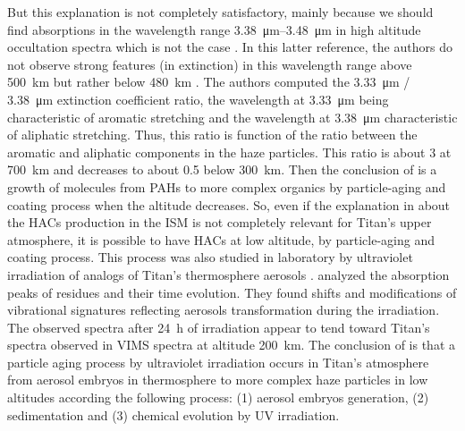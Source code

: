 \documentclass{arxiv-icarus}
\begin{document}
But this explanation is not completely satisfactory, mainly because we should find absorptions in the wavelength range \SIrange{3.38}{3.48}{\um} in high altitude occultation spectra which is not the case \citep{Courtin2015}. In this latter reference, the authors do not observe strong features (in extinction) in this wavelength range above \SI{500}{km} but rather below \SI{480}{km} \citep[Fig. 2]{Courtin2015}. The authors computed the \SI{3.33}{\um} / \SI{3.38}{\um} extinction coefficient ratio, the wavelength at \SI{3.33}{\um} being characteristic of aromatic  stretching and the wavelength at \SI{3.38}{\um} characteristic of aliphatic  stretching. Thus, this ratio is function of the ratio between the aromatic and aliphatic components in the haze particles.
This ratio is about 3 at \SI{700}{km} and decreases to about 0.5 below \SI{300}{km}. Then the conclusion of \cite{Courtin2015} is a growth of molecules from PAHs to more complex organics by particle-aging and coating process when the altitude decreases. So, even if the explanation in \cite{Dartois2004,Dartois2005} about the HACs production in the ISM is not completely relevant for Titan's upper atmosphere, it is possible to have HACs at low altitude, by particle-aging and coating process. This process was also studied in laboratory by ultraviolet irradiation of analogs of Titan's thermosphere aerosols \citep{Carrasco2018,Couturier-Tamburelli2018}.
\cite{Carrasco2018} analyzed the absorption peaks of residues and their time evolution. They found shifts and modifications of vibrational signatures reflecting aerosols transformation during the irradiation. The observed spectra after \SI{24}{h} of irradiation appear to tend toward Titan's spectra observed in VIMS spectra at altitude \SI{200}{km}. The conclusion of \cite{Carrasco2018} is that a particle aging process by ultraviolet irradiation occurs in Titan's atmosphere from aerosol embryos in thermosphere to more complex haze particles in low altitudes according the following process: (1) aerosol embryos generation, (2) sedimentation and (3) chemical evolution by UV irradiation.
\end{document}
